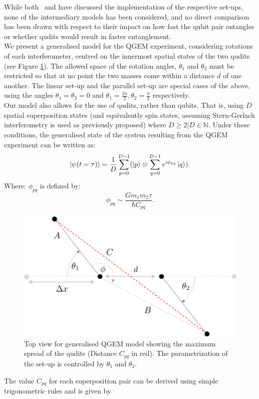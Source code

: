 \documentclass[%
 reprint,
 superscriptaddress,
 amsmath,
 amssymb,
 aps,
 longbibliography
]{revtex4-2}
\begin{document}
\indent While both~\cite{Bose2017} and \cite{Nguyen2019} have discussed the implementation of the respective set-ups, none of the intermediary models has been considered, and no direct comparison has been drawn with respect to their impact on how fast the qubit pair entangles or whether qudits would result in faster entanglement. \\
\indent We present a generalised model for the QGEM experiment, considering rotations of each interferometer, centred on the innermost spatial states of the two qudits (see Figure \ref{fig:generalised set-up}). The allowed space of the rotation angles, $\theta_1$ and $\theta_2$ must be restricted so that at no point the two masses come within a distance $d$ of one another. The linear set-up and the parallel set-up are special cases of the above, using the angles $\theta_1=\theta_2=0$ and $\theta_1 = \frac{3\pi}{2}, \theta_2 = \frac{\pi}{2}$ respectively. \\
\indent Our model also allows for the use of qudits, rather than qubits. That is, using $D$ spatial superposition states (and equivalently spin states, assuming Stern-Gerlach interferometry is used as previously proposed) where $D\ge2|D\in\mathbb{N}$. Under these conditions, the generalised state of the system resulting from the QGEM experiment can be written as:
		\begin{equation}
			\Ket{\psi(t = \tau)}=\frac{1}{D}\sum_{p = 0}^{D - 1}(\Ket{p}\otimes\sum_{q = 0}^{D - 1} e^{i\phi_{pq}} \Ket{q}).
		\end{equation}
Where: $\phi_{pq}$ is defined by:
		\begin{equation}
			\phi_{pq}\sim\frac{Gm_1m_2\tau}{\hbar C_{pq}}.
		\end{equation}
	\begin{figure}
	\centering
	    \par\medskip
		\includegraphics[width=1.0\columnwidth]{general_5.png}\par\medskip
		\caption{Top view for generalised QGEM model showing the maximum spread of the qudits (Distance $C_{pq}$ in red). The parametrization of the set-up is controlled by $\theta_1$ and $\theta_2$. \label{fig:generalised set-up}}
	\end{figure}
\indent The value $C_{pq}$ for each superposition pair can be derived using simple trigonometric rules and is given by
\end{document}
